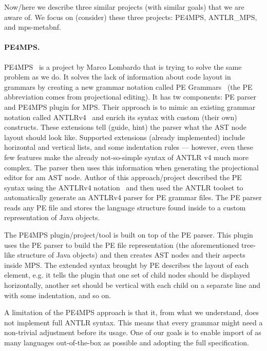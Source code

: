 Now/here we describe three similar projects (with similar goals) that we are aware of.
We focus on (consider) these three projects: PE4MPS, ANTLR{\_}MPS, and mps-metabnf.

\paragraph{PE4MPS.}
PE4MPS~\cite{ref:PE4MPS} is a project by Marco Lombardo that is trying to solve the same problem as we do.
It solves the lack of information about code layout in grammars by creating a new grammar notation called PE Grammars~\cite{ref:PE} (the PE abbreviation comes from projectional editing).
It has tw components: PE parser and PE4MPS plugin for MPS.
Their approach is to mimic an existing grammar notation called ANTLRv4~\cite{ANTLR4} and enrich its syntax with custom (their own) constructs.
These extensions tell (guide, hint) the parser what the AST node layout should look like.
Supported extensions (already implemented) include horizontal and vertical lists, and some indentation rules --- however, even these few features make the already not-so-simple syntax of ANTLR v4 much more complex.
The parser then uses this information when generating the projectional editor for am AST node.
Author of this approach/project described the PE syntax using the ANTLRv4 notation~\cite{ANTLR4reference} and then used the ANTLR toolset to automatically generate an ANTLRv4 parser for PE grammar files.
The PE parser reads any PE file and stores the language structure found inside to a custom representation of Java objects.

The PE4MPS plugin/project/tool is built on top of the PE parser.
This plugin uses the PE parser to build the PE file representation (the aforementioned tree-like structure of Java objects) and then creates AST nodes and their aspects inside MPS.
The extended syntax brought by PE describes the layout of each element, e.g. it tells the plugin that one set of child nodes should be displayed horizontally, another set should be vertical with each child on a separate line and with some indentation, and so on.

A limitation of the PE4MPS approach is that it, from what we understand, does not implement full ANTLR syntax.
This means that every grammar might need a non-trivial adjustment before its usage.
One of our goals is to enable import of as many languages out-of-the-box as possible and adopting the full specification.

